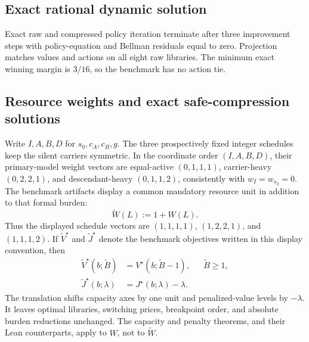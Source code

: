 \subsection{Exact rational dynamic solution}

Exact raw and compressed policy iteration terminate after three improvement
steps with policy-equation and Bellman residuals equal to zero.  Projection
matches values and actions on all eight raw libraries.  The minimum exact
winning margin is \(3/16\), so the benchmark has no action tie.

\begin{table}[htbp]
\centering
\small

\caption{Exact rational stationary solution of the raw-derived six-state
benchmark.  Values and winning margins are measured in the benchmark's payoff
units.  Denominator-one rationals are rendered as integers.  Appendix~D
reports the zero-residual certificate; Online Supplement~S4 reports the full
action-value record.}
\label{tab:canonical-exact-solution}
\end{table}

\subsection{Resource weights and exact safe-compression solutions}

Write \(I,A,B,D\) for \(s_0,c_A,c_B,g\).  The three prospectively fixed
integer schedules keep the silent carriers symmetric.  In the coordinate
order \((I,A,B,D)\), their primary-model weight vectors are equal-active
\((0,1,1,1)\), carrier-heavy \((0,2,2,1)\), and descendant-heavy
\((0,1,1,2)\), consistently with \(w_I=w_{s_0}=0\).  The benchmark artifacts
display a common mandatory resource unit in addition to that formal burden:
\begin{equation}\label{eq:canonical-display-burden}
 \widetilde W(L):=1+W(L).
\end{equation}
Thus the displayed schedule vectors are \((1,1,1,1)\), \((1,2,2,1)\), and
\((1,1,1,2)\).  If \(\widetilde V^\star\) and \(\widetilde J^\star\) denote
the benchmark objectives written in this display convention, then
\begin{align}
 \widetilde V^\star(b;\widetilde B)
 &=V^\star(b;\widetilde B-1), && \widetilde B\ge1,\label{eq:canonical-display-capacity}\\
 \widetilde J^\star(b;\lambda)
 &=J^\star(b;\lambda)-\lambda.\label{eq:canonical-display-penalty}
\end{align}
The translation shifts capacity axes by one unit and penalized-value levels by
\(-\lambda\).  It leaves optimal libraries, switching prices, breakpoint
order, and absolute burden reductions unchanged.  The capacity and penalty
theorems, and their Lean counterparts, apply to \(W\), not to
\(\widetilde W\).

